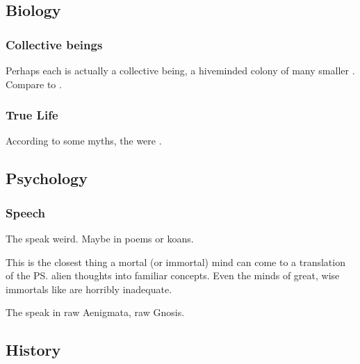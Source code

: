 \subsection{Biology}





\subsubsection{Collective beings}
Perhaps each \xs{} is actually a collective being, a hiveminded colony of many smaller \daemons. 
Compare to . 





\subsubsection{True Life}
According to some myths, the \xss were .









\subsection{Psychology}





\subsubsection{Speech}
The \xss{} speak weird. 
Maybe in poems or koans. 

This is the closest thing a mortal (or immortal) mind can come to a translation of the \ps{\xss} alien thoughts into familiar concepts. 
Even the minds of great, wise immortals like \QuessanthIshnaruchaefir{} are horribly inadequate. 

The \xss{} speak in raw Aenigmata, raw Gnosis. 










\subsection{History}





